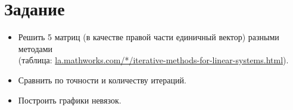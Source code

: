 \section*{Задание}

\begin{itemize}
    \item Решить 5 матриц (в качестве правой части единичный вектор) разными методами \\
    (таблица: \href{https://la.mathworks.com/help/matlab/math/iterative-methods-for-linear-systems.html}{la.mathworks.com/*/iterative-methods-for-linear-systems.html}).
    \item Сравнить по точности и количеству итераций.
    \item Построить графики невязок.
\end{itemize}
